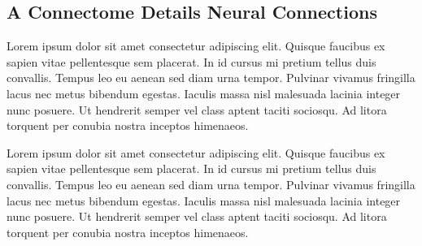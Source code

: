 \documentclass[11pt]{article}
\newcommand{\subsectionwithindent}[1]{
    \subsection*{#1}
    \hspace{\parindent} %
}
\begin{document}
\subsectionwithindent{A Connectome Details Neural Connections}
Lorem ipsum dolor sit amet consectetur adipiscing elit. Quisque faucibus ex sapien vitae pellentesque sem placerat. In id cursus mi pretium tellus duis convallis. Tempus leo eu aenean sed diam urna tempor. Pulvinar vivamus fringilla lacus nec metus bibendum egestas. Iaculis massa nisl malesuada lacinia integer nunc posuere. Ut hendrerit semper vel class aptent taciti sociosqu. Ad litora torquent per conubia nostra inceptos himenaeos.

Lorem ipsum dolor sit amet consectetur adipiscing elit. Quisque faucibus ex sapien vitae pellentesque sem placerat. In id cursus mi pretium tellus duis convallis. Tempus leo eu aenean sed diam urna tempor. Pulvinar vivamus fringilla lacus nec metus bibendum egestas. Iaculis massa nisl malesuada lacinia integer nunc posuere. Ut hendrerit semper vel class aptent taciti sociosqu. Ad litora torquent per conubia nostra inceptos himenaeos.
\end{document}
